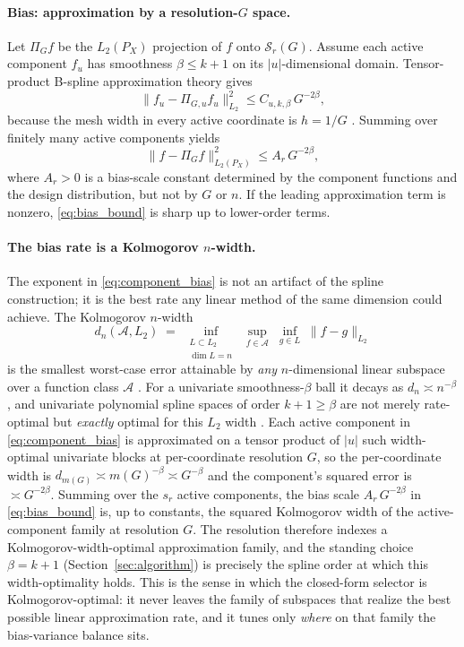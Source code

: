 \documentclass{article}
\begin{document}
\paragraph{Bias: approximation by a resolution-$G$ space.}
Let $\Pi_G f$ be the $L_2(P_X)$ projection of $f$ onto $\mathcal{S}_r(G)$. Assume each active component $f_u$ has smoothness $\beta\le k+1$ on its $|u|$-dimensional domain. Tensor-product B-spline approximation theory gives
\begin{equation}
    \|f_u-\Pi_{G,u}f_u\|_{L_2}^2 \le C_{u,k,\beta}\,G^{-2\beta},
    \label{eq:component_bias}
\end{equation}
because the mesh width in every active coordinate is $h=1/G$ \citep{deboor2001,schumaker2007,stone1982}. Summing over finitely many active components yields
\begin{equation}
    \|f-\Pi_G f\|_{L_2(P_X)}^2 \le A_r\,G^{-2\beta},
    \label{eq:bias_bound}
\end{equation}
where $A_r>0$ is a bias-scale constant determined by the component functions and the design distribution, but not by $G$ or $n$. If the leading approximation term is nonzero, \eqref{eq:bias_bound} is sharp up to lower-order terms.

\paragraph{The bias rate is a Kolmogorov $n$-width.}
The exponent in \eqref{eq:component_bias} is not an artifact of the spline construction; it is the best rate any linear method of the same dimension could achieve. The Kolmogorov $n$-width
\begin{equation}
    d_n(\mathcal{A},L_2) \;=\; \inf_{\substack{L\subset L_2 \\ \dim L = n}}\;\sup_{f\in\mathcal{A}}\;\inf_{g\in L}\;\|f-g\|_{L_2}
    \label{eq:nwidth}
\end{equation}
is the smallest worst-case error attainable by \emph{any} $n$-dimensional linear subspace over a function class $\mathcal{A}$ \citep{kolmogorov1936,pinkus1985}. For a univariate smoothness-$\beta$ ball it decays as $d_n\asymp n^{-\beta}$, and univariate polynomial spline spaces of order $k+1\ge\beta$ are not merely rate-optimal but \emph{exactly} optimal for this $L_2$ width \citep{melkman1978,pinkus1985}. Each active component in \eqref{eq:component_bias} is approximated on a tensor product of $|u|$ such width-optimal univariate blocks at per-coordinate resolution $G$, so the per-coordinate width is $d_{m(G)}\asymp m(G)^{-\beta}\asymp G^{-\beta}$ and the component's squared error is $\asymp G^{-2\beta}$. Summing over the $s_r$ active components, the bias scale $A_r\,G^{-2\beta}$ in \eqref{eq:bias_bound} is, up to constants, the squared Kolmogorov width of the active-component family at resolution $G$. The resolution therefore indexes a Kolmogorov-width-optimal approximation family, and the standing choice $\beta=k+1$ (Section~\ref{sec:algorithm}) is precisely the spline order at which this width-optimality holds. This is the sense in which the closed-form selector is Kolmogorov-optimal: it never leaves the family of subspaces that realize the best possible linear approximation rate, and it tunes only \emph{where} on that family the bias-variance balance sits.
\end{document}
